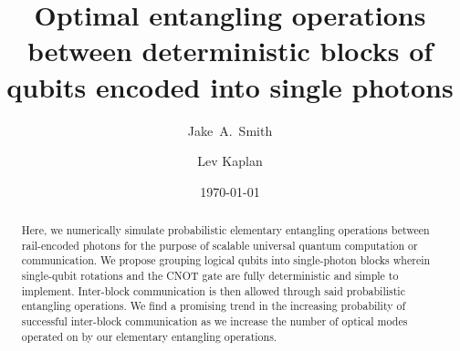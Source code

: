 \documentclass[aps,pra,twocolumn,superscriptaddress,floatfix,10pt]{revtex4}
\begin{document}
\newcommand{\beq}{\begin{equation}}
\newcommand{\eeq}{\end{equation}}
\newcommand{\ben}{\begin{eqnarray}}
\newcommand{\een}{\end{eqnarray}}
\newcommand{\bea}{\begin{array}}
\newcommand{\eea}{\end{array}}
\newcommand{\om}{(\omega )}
\newcommand{\bef}{\begin{figure}}
\newcommand{\eef}{\end{figure}}
\newcommand{\leg}[1]{\caption{\protect\rm{\protect\footnotesize{#1}}}}
\newcommand{\ew}[1]{\langle{#1}\rangle}
\newcommand{\be}[1]{\mid\!{#1}\!\mid}
\newcommand{\no}{\nonumber}
\newcommand{\etal}{{\em et~al }}
\newcommand{\geff}{g_{\mbox{\it{\scriptsize{eff}}}}}
\newcommand{\da}[1]{{#1}^\dagger}
\newcommand{\cf}{{\it cf.\/}\ }
\newcommand{\ie}{{\it i.e.\/}\ }   

\newcommand{\spazio}{\vspace{0.3cm}}%
\newcommand{\de}[1]{\frac{\partial}{\partial{#1}}}
\newcommand{\U}{\tilde{U}}
\newcommand{\V}{\tilde{V}}


\title{Optimal entangling operations between deterministic blocks of qubits encoded into single photons}

\author{Jake~A.~Smith}

\author{Lev Kaplan}

 \begin{abstract}
Here, we numerically simulate probabilistic elementary entangling operations between rail-encoded photons for the purpose of scalable universal quantum computation or communication. We propose grouping logical qubits into single-photon blocks wherein single-qubit rotations and the CNOT gate are fully deterministic and simple to implement. Inter-block communication is then allowed through said probabilistic entangling operations. We find a promising trend in the increasing probability of successful inter-block communication as we increase the number of optical modes operated on by our elementary entangling operations.
\end{abstract}                                                               
\date{\today}
\maketitle
\end{document}
